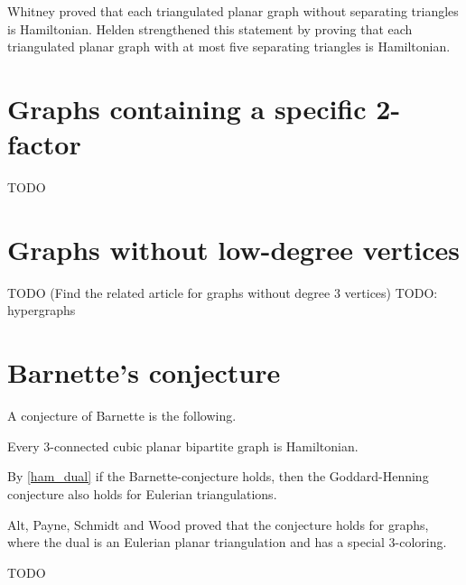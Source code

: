 \begin{remark}
  Whitney \cite{ham1} proved that each triangulated planar graph without separating
  triangles is Hamiltonian. Helden \cite{ham5} strengthened this statement by proving that
  each triangulated planar graph with at most five separating triangles is Hamiltonian.
\end{remark}

\section{Graphs containing a specific 2-factor}
TODO

\section{Graphs without low-degree vertices}
TODO (Find the related article for graphs without degree 3 vertices)
TODO: hypergraphs

\section{Barnette's conjecture}

A conjecture of Barnette \cite{barnette} is the following.
\begin{conj}
  Every 3-connected cubic planar bipartite graph is Hamiltonian.
\end{conj}

By \ref{ham_dual} if the Barnette-conjecture holds, then the Goddard-Henning
conjecture also holds for Eulerian triangulations.

Alt, Payne, Schmidt and Wood \cite{spec_barnette} proved that the conjecture holds
for graphs, where the dual is an Eulerian planar triangulation and has a special $3$-coloring.

TODO
